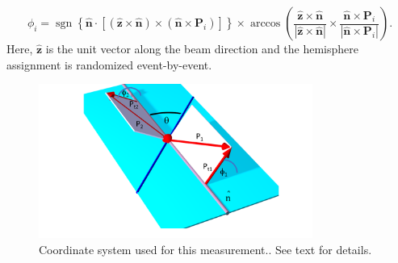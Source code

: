 \documentclass[aps,prX,preprint,groupedaddress,linenumbers]{revtex4-1}
\DeclareMathOperator{\sgn}{sgn}
\begin{document}
\begin{equation}
\phi_i=\sgn\left\lbrace\hat{\boldsymbol{n}}\cdot \left[ (\boldsymbol{\hat{z}}\times\hat{\boldsymbol{n}})\times(\hat{\boldsymbol{n}}\times{\boldsymbol{P}_{i}})\right] \right\rbrace\times \arccos\left(\frac{\hat{\boldsymbol{z}}\times\hat{\boldsymbol{n}}}{|\hat{\boldsymbol{z}}\times\hat{\boldsymbol{n}}|}\times\frac{\hat{\boldsymbol{n}}\times{\boldsymbol{P}_{i}}}{|\hat{\boldsymbol{n}}\times{\boldsymbol{P}_{i}}|}\right).
\label{eqn:collinsangledefine2}
\end{equation}
Here, $\boldsymbol{\hat{z}}$ is the unit vector along the beam direction and the hemisphere assignment is randomized event-by-event.

\begin{figure}
\includegraphics[width=0.8\textwidth]{Collins_angle2.pdf}
\caption{Coordinate system used for this measurement.\label{fig:coo}. See text for details.}
\end{figure}


% 


\end{document}
